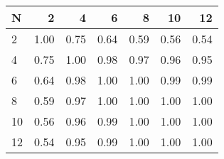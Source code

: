 \begin{tabular}{lrrrrrr}
\toprule
N &    2  &    4  &    6  &    8  &    10 &    12 \\
\midrule
2  &  1.00 &  0.75 &  0.64 &  0.59 &  0.56 &  0.54 \\
4  &  0.75 &  1.00 &  0.98 &  0.97 &  0.96 &  0.95 \\
6  &  0.64 &  0.98 &  1.00 &  1.00 &  0.99 &  0.99 \\
8  &  0.59 &  0.97 &  1.00 &  1.00 &  1.00 &  1.00 \\
10 &  0.56 &  0.96 &  0.99 &  1.00 &  1.00 &  1.00 \\
12 &  0.54 &  0.95 &  0.99 &  1.00 &  1.00 &  1.00 \\
\bottomrule
\end{tabular}
